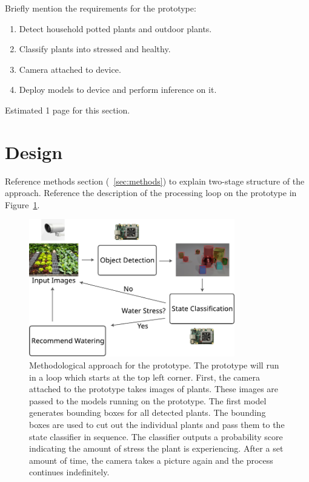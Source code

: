 \documentclass[draft,final]{vutinfth} %
\begin{document}
Briefly mention the requirements for the prototype:

\begin{enumerate}
\item Detect household potted plants and outdoor plants.
\item Classify plants into stressed and healthy.
\item Camera attached to device.
\item Deploy models to device and perform inference on it.
\end{enumerate}

Estimated 1 page for this section.

\section{Design}
\label{sec:design}

Reference methods section (~\ref{sec:methods}) to explain two-stage
structure of the approach. Reference the description of the processing
loop on the prototype in Figure~\ref{fig:setup}.

\begin{figure}
  \centering
  \includegraphics[width=0.8\textwidth]{graphics/setup.pdf}
  \caption[Methodological approach for the prototype.]{Methodological
    approach for the prototype. The prototype will run in a loop which
    starts at the top left corner. First, the camera attached to the
    prototype takes images of plants. These images are passed to the
    models running on the prototype. The first model generates
    bounding boxes for all detected plants. The bounding boxes are
    used to cut out the individual plants and pass them to the state
    classifier in sequence. The classifier outputs a probability score
    indicating the amount of stress the plant is experiencing. After a
    set amount of time, the camera takes a picture again and the
    process continues indefinitely.}
  \label{fig:setup}
\end{figure}
\end{document}
